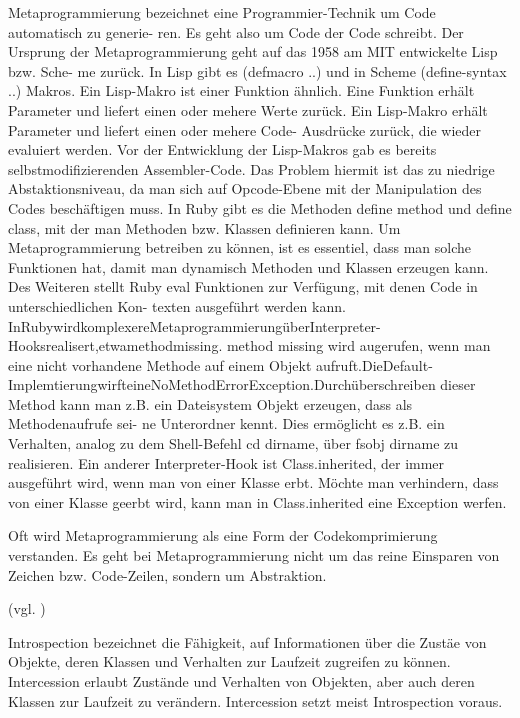 \documentclass[11pt,english,ngerman, headsepline]{scrreprt}
\begin{document}
Metaprogrammierung bezeichnet eine Programmier-Technik um Code automatisch zu
generie- ren. Es geht also um Code der Code schreibt.
Der Ursprung der Metaprogrammierung geht auf das 1958 am MIT entwickelte Lisp
bzw. Sche- me zurück. In Lisp gibt es (defmacro ..) und in Scheme (define-syntax
..) Makros. Ein Lisp-Makro ist einer Funktion ähnlich. Eine Funktion erhält
Parameter und liefert einen oder mehere Werte zurück. Ein Lisp-Makro erhält
Parameter und liefert einen oder mehere Code- Ausdrücke zurück, die wieder
evaluiert werden.
Vor der Entwicklung der Lisp-Makros gab es bereits selbstmodifizierenden
Assembler-Code. Das Problem hiermit ist das zu niedrige Abstaktionsniveau, da
man sich auf Opcode-Ebene mit der Manipulation des Codes beschäftigen muss.
In Ruby gibt es die Methoden define method und define class, mit der man
Methoden bzw. Klassen definieren kann. Um Metaprogrammierung betreiben zu
können, ist es essentiel, dass man solche Funktionen hat, damit man dynamisch
Methoden und Klassen erzeugen kann. Des Weiteren stellt Ruby eval Funktionen zur
Verfügung, mit denen Code in unterschiedlichen Kon- texten ausgeführt werden
kann.
InRubywirdkomplexereMetaprogrammierungüberInterpreter-Hooksrealisert,etwamethodmissing.
method missing wird augerufen, wenn man eine nicht vorhandene Methode auf einem
Objekt
aufruft.DieDefault-ImplemtierungwirfteineNoMethodErrorException.Durchüberschreiben
dieser Method kann man z.B. ein Dateisystem Objekt erzeugen, dass als
Methodenaufrufe sei- ne Unterordner kennt. Dies ermöglicht es z.B. ein
Verhalten, analog zu dem Shell-Befehl cd dirname, über fsobj dirname zu
realisieren.
Ein anderer Interpreter-Hook ist Class.inherited, der immer ausgeführt wird,
wenn man von einer Klasse erbt. Möchte man verhindern, dass von einer Klasse
geerbt wird, kann man in Class.inherited eine Exception werfen.

Oft wird Metaprogrammierung als eine Form der Codekomprimierung verstanden. Es
geht bei Metaprogrammierung nicht um das reine Einsparen von Zeichen bzw. Code-Zeilen, sondern um Abstraktion.

(vgl. \cite{biekermetaprogrammierung})

Introspection bezeichnet die Fähigkeit, auf Informationen über die Zustäe
von Objekte, deren Klassen und Verhalten zur Laufzeit zugreifen zu können.
Intercession erlaubt Zustände und Verhalten von Objekten, aber auch deren
Klassen zur Laufzeit zu verändern. Intercession setzt meist Introspection
voraus.\cite{mpInGroovy}
\end{document}
